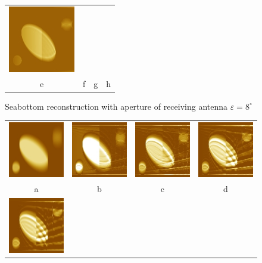 \documentclass{procDDs}
\begin{document}
\begin{figure}[h!]
\begin{tabular}{cccc}
		\includegraphics[width=0.2\linewidth]{k-img-9-9.jpg}\\
		e & f & g & h
	\end{tabular}
	\caption{Seabottom reconstruction with aperture of receiving antenna $\varepsilon=8^\circ$}
	\label{ris:desc4}
\end{figure}
\begin{figure}[h!]\center%
	\begin{tabular}{cccc}
		\includegraphics[width=0.2\linewidth]{k-img-13-1.jpg}&
		\includegraphics[width=0.2\linewidth]{k-img-13-3.jpg}&
		\includegraphics[width=0.2\linewidth]{k-img-13-4.jpg}&
		\includegraphics[width=0.2\linewidth]{k-img-13-5.jpg}\\
		a & b & c & d\\
		\includegraphics[width=0.2\linewidth]{k-img-13-6.jpg}&

\end{tabular}
\end{figure}
\end{document}
